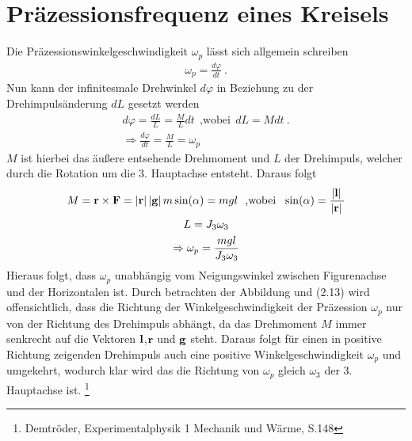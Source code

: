 

\section{Präzessionsfrequenz eines Kreisels}

Die Präzessionswinkelgeschwindigkeit $\omega_p$ lässt sich allgemein schreiben 
\begin{align}
    \omega_p = \frac{d\varphi}{dt}~.
\end{align}
Nun kann der infinitesmale Drehwinkel $d\varphi$ in Beziehung zu der Drehimpulsänderung $dL$ gesetzt werden
\begin{gather}
    d\varphi = \frac{dL}{L} = \frac{M}{L} dt~~\text{,wobei}~~dL = M dt~.\\
    \Rightarrow \frac{d\varphi}{dt} = \frac{M}{L} = \omega_p
\end{gather}
$M$ ist hierbei das äußere entsehende Drehmoment und $L$ der Drehimpuls, welcher durch die Rotation um die 3. Hauptachse entsteht. Daraus folgt
\begin{gather}
    M = \boldsymbol{\mathbf{r}} \times \boldsymbol{\mathbf{F}} = \abs*{\boldsymbol{\mathbf{r}}}\abs*{\boldsymbol{\mathbf{g}}}m\sin(\alpha) = mgl~~\text{,wobei}~~\sin(\alpha)=\frac{\abs*{\boldsymbol{\mathbf{l}}}}{\abs*{\boldsymbol{\mathbf{r}}}}\\
    L = J_3\omega_3\\
    \Rightarrow \omega_p = \frac{mgl}{J_3\omega_3}
\end{gather}
Hieraus folgt, dass $\omega_p$ unabhängig vom Neigungswinkel zwischen Figurenachse und der Horizontalen ist. Durch betrachten der Abbildung und (2.13) wird offensichtlich, dass die Richtung der Winkelgeschwindigkeit der Präzession $\omega_p$ nur von der Richtung des Drehimpuls abhängt, da das Drehmoment $M$ immer senkrecht auf die Vektoren $\boldsymbol{\mathbf{l}}$,$\boldsymbol{\mathbf{r}}$ und $\boldsymbol{\mathbf{g}}$ steht. Daraus folgt für einen in positive Richtung zeigenden Drehimpuls auch eine positive Winkelgeschwindigkeit $\omega_p$ und umgekehrt, wodurch klar wird das die Richtung von $\omega_p$ gleich $\omega_3$ der 3. Hauptachse ist. \footnote{Demtröder, Experimentalphysik 1 Mechanik und Wärme, S.148}